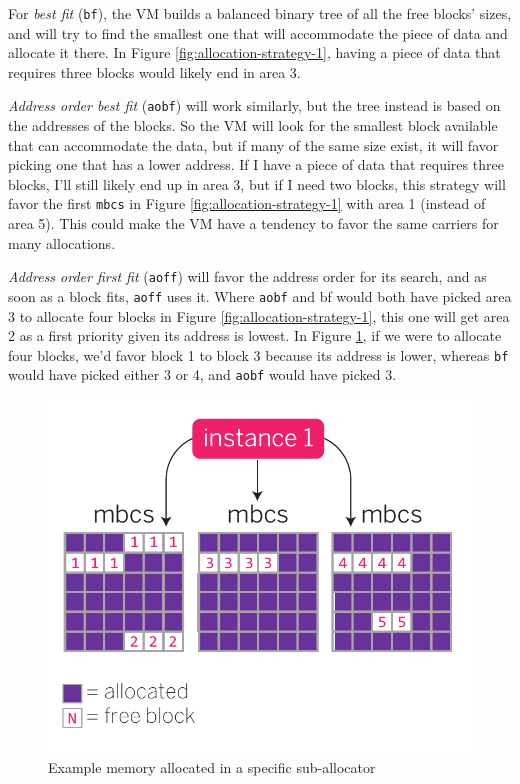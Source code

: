 \documentclass[11pt, oneside]{book}   	%
\newcommand{\term}[1]{\Verb`#1`}
\begin{document}
For \emph{best fit} (\term{bf}), the VM builds a balanced binary tree of all the free blocks' sizes, and will try to find the smallest one that will accommodate the piece of data and allocate it there. In Figure \ref{fig:allocation-strategy-1}, having a piece of data that requires three blocks would likely end in area 3.

\emph{Address order best fit} (\term{aobf}) will work similarly, but the tree instead is based on the addresses of the blocks. So the VM will look for the smallest block available that can accommodate the data, but if many of the same size exist, it will favor picking one that has a lower address. If I have a piece of data that requires three blocks, I'll still likely end up in area 3, but if I need two blocks, this strategy will favor the first \term{mbcs} in Figure \ref{fig:allocation-strategy-1} with area 1 (instead of area 5). This could make the VM have a tendency to favor the same carriers for many allocations.

\emph{Address order first fit} (\term{aoff}) will favor the address order for its search, and as soon as a block fits, \term{aoff} uses it. Where \term{aobf} and bf would both have picked area 3 to allocate four blocks in Figure \ref{fig:allocation-strategy-1}, this one will get area 2 as a first priority given its address is lowest. In Figure \ref{fig:allocation-strategy-2}, if we were to allocate four blocks, we'd favor block 1 to block 3 because its address is lower, whereas \term{bf} would have picked either 3 or 4, and \term{aobf} would have picked 3.

\begin{figure}
  \includegraphics{allocation-strategy-2.pdf}%
  \caption{Example memory allocated in a specific sub-allocator}%
   \label{fig:allocation-strategy-2}
\end{figure}
\end{document}
